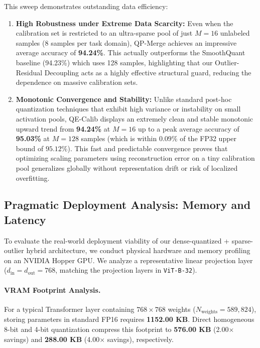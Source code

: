 This sweep demonstrates outstanding data efficiency:
\begin{enumerate}
    \item \textbf{High Robustness under Extreme Data Scarcity:} Even when the calibration set is restricted to an ultra-sparse pool of just $M = 16$ unlabeled samples (8 samples per task domain), QP-Merge achieves an impressive average accuracy of \textbf{94.24\%}. This actually outperforms the SmoothQuant baseline (94.23\%) which uses 128 samples, highlighting that our Outlier-Residual Decoupling acts as a highly effective structural guard, reducing the dependence on massive calibration sets.
    \item \textbf{Monotonic Convergence and Stability:} Unlike standard post-hoc quantization techniques that exhibit high variance or instability on small activation pools, QE-Calib displays an extremely clean and stable monotonic upward trend from \textbf{94.24\%} at $M=16$ up to a peak average accuracy of \textbf{95.03\%} at $M=128$ samples (which is within $0.09\%$ of the FP32 upper bound of $95.12\%$). This fast and predictable convergence proves that optimizing scaling parameters using reconstruction error on a tiny calibration pool generalizes globally without representation drift or risk of localized overfitting.
\end{enumerate}

\subsection{Pragmatic Deployment Analysis: Memory and Latency}
To evaluate the real-world deployment viability of our dense-quantized + sparse-outlier hybrid architecture, we conduct physical hardware and memory profiling on an NVIDIA Hopper GPU. We analyze a representative linear projection layer ($d_{\text{in}} = d_{\text{out}} = 768$, matching the projection layers in \texttt{ViT-B-32}).

\paragraph{VRAM Footprint Analysis.}
For a typical Transformer layer containing $768 \times 768$ weights ($N_{\text{weights}} = 589,824$), storing parameters in standard FP16 requires \textbf{1152.00 KB}. Direct homogeneous 8-bit and 4-bit quantization compress this footprint to \textbf{576.00 KB} (2.00$\times$ savings) and \textbf{288.00 KB} (4.00$\times$ savings), respectively. 

